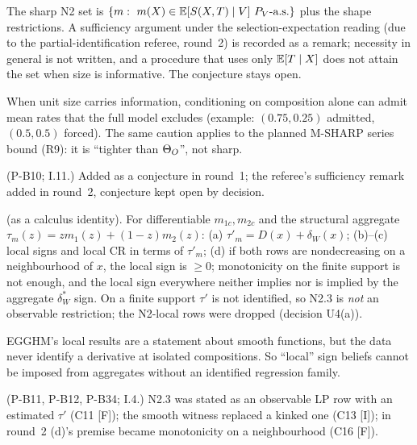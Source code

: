 \begin{result}\label{res:n22prime}
 The sharp N2 set is
$\{m:\ m(X)\in\E[S(X,T)\mid V]\ P_V\text{-a.s.}\}$ plus the shape restrictions.
A sufficiency argument under the selection-expectation reading (due to the
partial-identification referee, round~2) is recorded as a remark; necessity in
general is not written, and a procedure that uses only $\mathbb E[T\mid X]$ does not
attain the set when size is informative. The conjecture stays open.
\end{result}
\begin{plain}
When unit size carries information, conditioning on composition alone can admit
mean rates that the full model excludes (example: $(0.75,0.25)$ admitted,
$(0.5,0.5)$ forced). The same caution applies to the planned M-SHARP series
bound (R9): it is ``tighter than $\Theta_O$'', not sharp.
\end{plain}
\begin{revnote}(P-B10; I.11.) Added as a conjecture in round~1; the referee's sufficiency remark added in round~2, conjecture kept open by decision.\end{revnote}

\begin{result}\label{res:n23}
 (as a calculus identity). For differentiable $m_{1c},m_{2c}$ and the
structural aggregate $\tau_m(z)=zm_1(z)+(1-z)m_2(z)$: (a)
$\tau'_m=D(x)+\delta_W(x)$; (b)--(c) local signs and local CR in terms of
$\tau'_m$; (d) if both rows are nondecreasing on a neighbourhood of $x$, the
local sign is $\ge0$; monotonicity on the finite support is not enough, and the
local sign everywhere neither implies nor is implied by the aggregate $\delta^*_W$
sign. On a finite support $\tau'$ is not identified, so N2.3 is \emph{not} an
observable restriction; the N2-local rows were dropped (decision U4(a)).
\end{result}
\begin{plain}
EGGHM's local results are a statement about smooth functions, but the data never
identify a derivative at isolated compositions. So ``local'' sign beliefs cannot be
imposed from aggregates without an identified regression family.
\end{plain}
\begin{revnote}
(P-B11, P-B12, P-B34; I.4.) N2.3 was stated as an observable LP row with an
estimated $\tau'$ (C11 [F]); the smooth witness replaced a kinked one (C13 [I]);
in round~2 (d)'s premise became monotonicity on a neighbourhood (C16 [F]).
\end{revnote}

